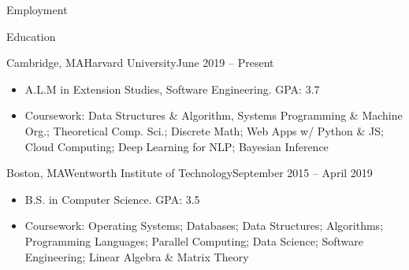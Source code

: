\documentclass[]{mcdowellcv}
\begin{document}
\begin{cvsection}{Employment}
		
	\end{cvsection}
	
	\begin{cvsection}{Education}
		\begin{cvsubsection}{Cambridge, MA}{Harvard University}{June 2019 -- Present}
		
			\begin{itemize}
				\item A.L.M in Extension Studies, Software Engineering. GPA: 3.7
				\item Coursework: Data Structures \& Algorithm, Systems Programming \& Machine Org.; Theoretical Comp. Sci.; Discrete Math; Web Apps w/ Python \& JS; Cloud Computing; Deep Learning for NLP; Bayesian Inference
				\end{itemize}
		\end{cvsubsection}
		\begin{cvsubsection}{Boston, MA}{Wentworth Institute of Technology}{September 2015 -- April 2019}
		\vspace{2mm}
			\begin{itemize}
				\item B.S. in Computer Science. GPA: 3.5
				\item Coursework: Operating Systems; Databases; Data Structures; Algorithms; Programming Languages; Parallel Computing; Data Science; Software Engineering; Linear Algebra \& Matrix Theory
			\end{itemize}
		\end{cvsubsection}
	\end{cvsection}
	
\end{document}
